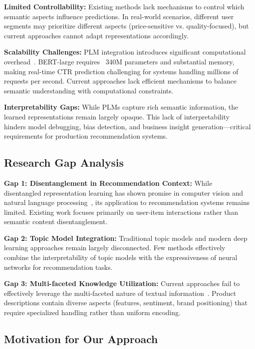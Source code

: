 \textbf{Limited Controllability:} Existing methods lack mechanisms to control which semantic aspects influence predictions. In real-world scenarios, different user segments may prioritize different aspects (price-sensitive vs. quality-focused), but current approaches cannot adapt representations accordingly.

\textbf{Scalability Challenges:} PLM integration introduces significant computational overhead~\cite{guo2024embedding}. BERT-large requires ~340M parameters and substantial memory, making real-time CTR prediction challenging for systems handling millions of requests per second. Current approaches lack efficient mechanisms to balance semantic understanding with computational constraints.

\textbf{Interpretability Gaps:} While PLMs capture rich semantic information, the learned representations remain largely opaque. This lack of interpretability hinders model debugging, bias detection, and business insight generation—critical requirements for production recommendation systems.

\subsection{Research Gap Analysis}

\textbf{Gap 1: Disentanglement in Recommendation Context:} While disentangled representation learning has shown promise in computer vision and natural language processing~\cite{locatello2019challenging}, its application to recommendation systems remains limited. Existing work focuses primarily on user-item interactions rather than semantic content disentanglement.

\textbf{Gap 2: Topic Model Integration:} Traditional topic models and modern deep learning approaches remain largely disconnected. Few methods effectively combine the interpretability of topic models with the expressiveness of neural networks for recommendation tasks.

\textbf{Gap 3: Multi-faceted Knowledge Utilization:} Current approaches fail to effectively leverage the multi-faceted nature of textual information~\cite{zhang2024towards}. Product descriptions contain diverse aspects (features, sentiment, brand positioning) that require specialized handling rather than uniform encoding.

\subsection{Motivation for Our Approach}

